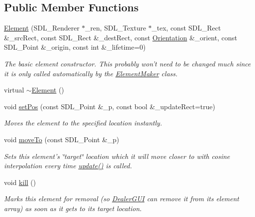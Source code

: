 \subsection*{Public Member Functions}
\begin{DoxyCompactItemize}
\item 
\hyperlink{classGUI_1_1Element_a32d19575ac974b7d34ef5cb77f9ef6a6}{Element} (S\-D\-L\-\_\-\-Renderer $\ast$\-\_\-ren, S\-D\-L\-\_\-\-Texture $\ast$\-\_\-tex, const S\-D\-L\-\_\-\-Rect \&\-\_\-src\-Rect, const S\-D\-L\-\_\-\-Rect \&\-\_\-dest\-Rect, const \hyperlink{namespaceGUI_a1a3a8094d47f7be06ce123fab38abf6a}{Orientation} \&\-\_\-orient, const S\-D\-L\-\_\-\-Point \&\-\_\-origin, const int \&\-\_\-lifetime=0)
\begin{DoxyCompactList}\small\item\em The basic element constructor. This probably won't need to be changed much since it is only called automatically by the \hyperlink{classGUI_1_1ElementMaker}{Element\-Maker} class. \end{DoxyCompactList}\item 
virtual \hyperlink{classGUI_1_1Element_a4beaf3aba9b32e77684910baba5f43bc}{$\sim$\-Element} ()
\item 
void \hyperlink{classGUI_1_1Element_acb86e75c5d90e302b0c27c01106168a9}{set\-Pos} (const S\-D\-L\-\_\-\-Point \&\-\_\-p, const bool \&\-\_\-update\-Rect=true)
\begin{DoxyCompactList}\small\item\em Moves the element to the specified location instantly. \end{DoxyCompactList}\item 
void \hyperlink{classGUI_1_1Element_a6f7171736744f64faf428c17c74695df}{move\-To} (const S\-D\-L\-\_\-\-Point \&\-\_\-p)
\begin{DoxyCompactList}\small\item\em Sets this element's \char`\"{}target\char`\"{} location which it will move closer to with cosine interpolation every time \hyperlink{classGUI_1_1Element_ac33ecb92a9f9cb810bea83f31e4c14c9}{update()} is called. \end{DoxyCompactList}\item 
void \hyperlink{classGUI_1_1Element_aff9657e904abf6a3d8fc5ef0c23d1e03}{kill} ()
\begin{DoxyCompactList}\small\item\em Marks this element for removal (so \hyperlink{classGUI_1_1DealerGUI}{Dealer\-G\-U\-I} can remove it from its element array) as soon as it gets to its target location. \end{DoxyCompactList}\item 

\end{DoxyCompactItemize}
